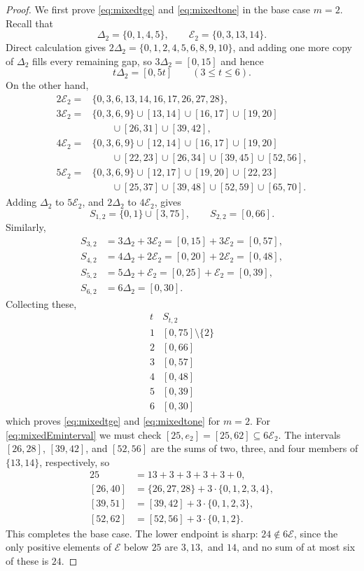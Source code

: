 \documentclass[12pt]{article}
\theoremstyle{plain}
\begin{document}
\begin{proof}
We first prove \eqref{eq:mixedtge} and \eqref{eq:mixedtone} in the base
case $m=2$.  Recall that
\[
 \Delta_2=\{0,1,4,5\},\qquad \mathcal E_2=\{0,3,13,14\}.
\]
Direct calculation gives $2\Delta_2=\{0,1,2,4,5,6,8,9,10\}$, and adding one
more copy of $\Delta_2$ fills every remaining gap, so $3\Delta_2=[0,15]$ and hence
\[
 t\Delta_2=[0,5t]\qquad(3\leq t\leq6).
\]
On the other hand,
\[
\begin{aligned}
2\mathcal E_2
={}&\{0,3,6,13,14,16,17,26,27,28\},\\[1ex]
3\mathcal E_2
={}&\{0,3,6,9\}\cup[13,14]\cup[16,17]\cup[19,20]\\
&\qquad\cup[26,31]\cup[39,42],\\[1ex]
4\mathcal E_2
={}&\{0,3,6,9\}\cup[12,14]\cup[16,17]\cup[19,20]\\
&\qquad\cup[22,23]\cup[26,34]\cup[39,45]\cup[52,56],\\[1ex]
5\mathcal E_2
={}&\{0,3,6,9\}\cup[12,17]\cup[19,20]\cup[22,23]\\
&\qquad\cup[25,37]\cup[39,48]\cup[52,59]\cup[65,70].
\end{aligned}
\]
Adding $\Delta_2$ to $5\mathcal E_2$, and $2\Delta_2$ to $4\mathcal E_2$, gives
\[
 S_{1,2}=\{0,1\}\cup[3,75],\qquad S_{2,2}=[0,66].
\]
Similarly,
\[
\begin{aligned}
S_{3,2}&=3\Delta_2+3\mathcal E_2=[0,15]+3\mathcal E_2=[0,57],\\[1ex]
S_{4,2}&=4\Delta_2+2\mathcal E_2=[0,20]+2\mathcal E_2=[0,48],\\[1ex]
S_{5,2}&=5\Delta_2+\mathcal E_2 =[0,25]+\mathcal E_2 =[0,39],\\[1ex]
S_{6,2}&=6\Delta_2=[0,30].
\end{aligned}
\]
Collecting these,
\[
\begin{array}{c|c}
t&S_{t,2}\\ \hline
1&[0,75]\setminus\{2\}\\
2&[0,66]\\
3&[0,57]\\
4&[0,48]\\
5&[0,39]\\
6&[0,30]
\end{array}
\]
which proves \eqref{eq:mixedtge} and \eqref{eq:mixedtone} for $m=2$.
For \eqref{eq:mixedEminterval} we must check
$[25,e_2]=[25,62]\subseteq6\mathcal E_2$.  The intervals $[26,28]$,
$[39,42]$, and $[52,56]$ are the sums of two, three, and four members of
$\{13,14\}$, respectively, so
\[
\begin{aligned}
25&=13+3+3+3+3+0,\\
[26,40]&=\{26,27,28\}+3\cdot\{0,1,2,3,4\},\\
[39,51]&=[39,42]+3\cdot\{0,1,2,3\},\\
[52,62]&=[52,56]+3\cdot\{0,1,2\}.
\end{aligned}
\]
This completes the base case.  The lower endpoint is sharp:
$24\notin6\mathcal E$, since the only positive elements of $\mathcal E$
below $25$ are $3,13,$ and $14$, and no sum of at most six of these is
$24$.


\end{proof}
\end{document}
